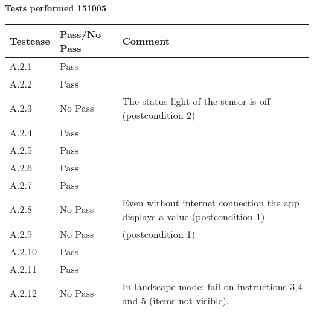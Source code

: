 \renewcommand{\testdate}{151005}
\textbf{Tests performed \testdate}
	\begin{center}
  		\begin{tabular}{| p{3cm} | p{5cm} | p{5cm} |}
    		\hline
	    	\textbf{Testcase}			& \textbf{Pass/No Pass} 	& \textbf{Comment} \\ \hline
    		A.2.1		 						& Pass 								&  				\\ \hline
    		A.2.2		 						& Pass  							& 				 \\	\hline
    		A.2.3		 						& No Pass 							& The status light of the sensor is off (postcondition 2)				 \\	\hline
    		A.2.4		 						& Pass  							& 				 \\	\hline
    		A.2.5		 						& Pass 								& 			 \\	\hline
    		A.2.6		 						& Pass 								& 				 \\	\hline
    		A.2.7		 						& Pass 								& 				 \\	\hline
    		A.2.8		 						& No Pass 							& Even without internet connection the app displays a value (postcondition 1)			 \\	\hline
    		A.2.9		 						& No Pass 							& (postcondition 1)				 \\	\hline
    		A.2.10	 							& Pass 								& 				 \\	\hline
    		A.2.11	 							& Pass 								& 				 \\	\hline
    		A.2.12	 							& No Pass 								& In landscape mode: fail on instructions 3,4 and 5 (items not visible). 				 \\	\hline
 		 \end{tabular}
	\end{center}
